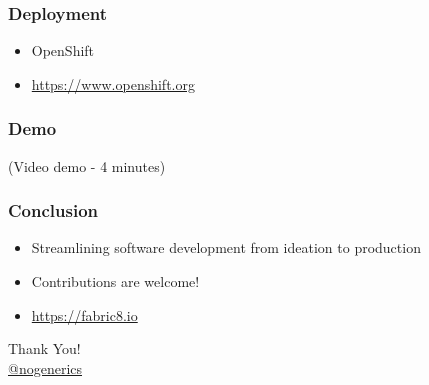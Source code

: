 \documentclass[aspectratio=169]{beamer}
\begin{document}
\begin{frame}
  \frametitle{Deployment}

\begin{itemize}
  \item<1-> OpenShift
  \item<2-> \url{https://www.openshift.org}
\end{itemize}
\end{frame}



\begin{frame}
  \frametitle{Demo}

  (Video demo - 4 minutes)

\end{frame}


\begin{frame}
  \frametitle{Conclusion}

\begin{itemize}
  \item<1-> Streamlining software development from ideation to production
  \item<2-> Contributions are welcome!
  \item<3-> \url{https://fabric8.io}
\end{itemize}
\end{frame}


\begin{frame}%
\begin{center}
{\huge Thank You!}\\[1cm]
{\large \href{https://twitter.com/nogenerics}{@nogenerics}}
\end{center}
\end{frame}
\end{document}
